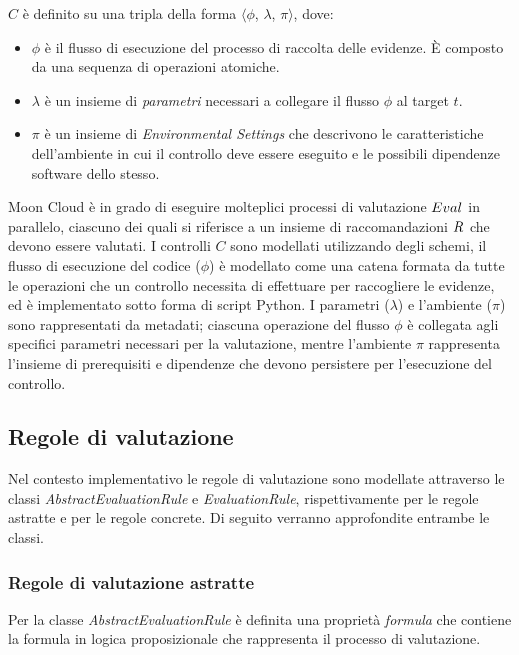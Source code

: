 \documentclass[../main.tex]{subfiles}
\begin{document}
\begin{definition}[\textbf{$C$}]\label{def:control}
    $C$ è definito su una tripla della forma $\langle$$\phi$, $\lambda$, $\pi$$\rangle$, dove:
\begin{itemize}
	\item $\phi$ è il flusso di esecuzione del processo di raccolta  delle evidenze. È composto da una sequenza di operazioni atomiche. 
	\item $\lambda$ è un insieme di \textit{parametri} necessari a collegare il flusso $\phi$ al target $t$. 
	\item $\pi$ è un insieme di \textit{Environmental Settings} che descrivono le caratteristiche dell'ambiente in cui il controllo deve essere eseguito e le possibili dipendenze software dello stesso. 
\end{itemize}
\end{definition}

Moon Cloud è in grado di eseguire molteplici processi di valutazione $ Eval_{}\/ $ in parallelo, ciascuno dei quali si riferisce a un insieme di raccomandazioni $R_{}\/$ che devono essere valutati.
I controlli $C$ sono modellati utilizzando degli schemi, il flusso di esecuzione del codice ($\phi$) è modellato come una catena formata da tutte le operazioni che un controllo necessita di effettuare per raccogliere le evidenze, ed è implementato sotto forma di script Python.
I parametri ($\lambda$) e l'ambiente ($\pi$) sono rappresentati da metadati; ciascuna operazione del flusso $\phi$ è collegata agli specifici parametri necessari per la valutazione, mentre l'ambiente $\pi$ rappresenta l'insieme di prerequisiti e dipendenze che devono persistere per l'esecuzione del controllo\cite{MyPaper}.


\subsection{Regole di valutazione}
Nel contesto implementativo le regole di valutazione sono modellate attraverso le classi \textit{AbstractEvaluationRule} e \textit{EvaluationRule}, rispettivamente per le regole astratte e per le regole concrete.
Di seguito verranno approfondite entrambe le classi.

\subsubsection{Regole di valutazione astratte}
Per la classe \textit{AbstractEvaluationRule} è definita una proprietà \textit{formula} che contiene la formula in logica proposizionale che rappresenta il processo di valutazione.
\end{document}
